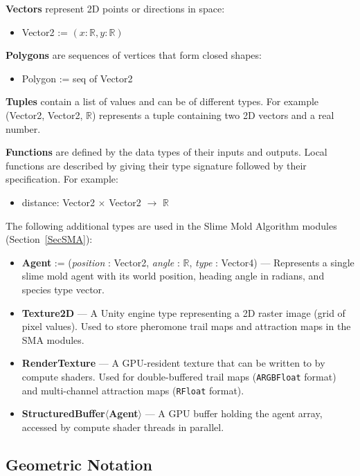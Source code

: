 \documentclass[12pt, titlepage]{article}
\begin{document}
\textbf{Vectors} represent 2D points or directions in space:
\begin{itemize}
\item Vector2 := $(x: \mathbb{R}, y: \mathbb{R})$
\end{itemize}

\textbf{Polygons} are sequences of vertices that form closed shapes:
\begin{itemize}
\item Polygon := seq of Vector2
\end{itemize}

\textbf{Tuples} contain a list of values and can be of different types. For example (Vector2, Vector2, $\mathbb{R}$) represents a tuple containing two 2D vectors and a real number.

\textbf{Functions} are defined by the data types of their inputs and outputs. Local functions are described by giving their type signature followed by their specification. For example:
\begin{itemize}
\item distance: Vector2 $\times$ Vector2 $\rightarrow$ $\mathbb{R}$
\end{itemize}

The following additional types are used in the Slime Mold Algorithm modules (Section~\ref{SecSMA}):
\begin{itemize}
\item \textbf{Agent} := (\textit{position} : Vector2, \textit{angle} : $\mathbb{R}$, \textit{type} : Vector4) --- Represents a single slime mold agent with its world position, heading angle in radians, and species type vector.
\item \textbf{Texture2D} --- A Unity engine type representing a 2D raster image (grid of pixel values). Used to store pheromone trail maps and attraction maps in the SMA modules.
\item \textbf{RenderTexture} --- A GPU-resident texture that can be written to by compute shaders. Used for double-buffered trail maps (\texttt{ARGBFloat} format) and multi-channel attraction maps (\texttt{RFloat} format).
\item \textbf{StructuredBuffer$\langle$Agent$\rangle$} --- A GPU buffer holding the agent array, accessed by compute shader threads in parallel.
\end{itemize}

\subsection{Geometric Notation}
\end{document}
